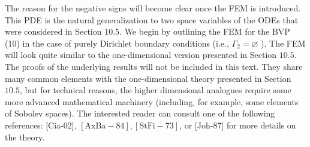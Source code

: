 \documentclass[../main.tex]{subfiles}
\begin{document}
The reason for the negative signs will become clear once the FEM is introduced. This PDE is the natural generalization to two space variables of the ODEs that were considered in Section 10.5. We begin by outlining the FEM for the BVP (10) in the case of purely Dirichlet boundary conditions (i.e., $\Gamma_{2}=\varnothing$ ). The FEM will look quite similar to the one-dimensional version presented in Section $10.5$. The proofs of the underlying results will not be included in this text. They share many common elements with the one-dimensional theory presented in Section $10.5$, but for technical reasons, the higher dimensional analogues require some more advanced mathematical machinery (including, for example, some elements of Sobolev spaces). The interested reader can consult one of the following references: [Cia-02], $[\mathrm{AxBa}-84],[\mathrm{StFi}-73]$, or [Joh-87] for more details on the theory.
\end{document}
